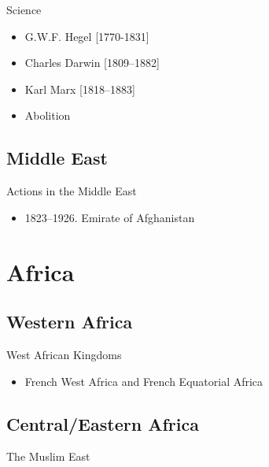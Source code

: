 
% 

\begin{frame}{Science}
	\begin{itemize}
		\item<1->G.W.F. Hegel [1770-1831]
		\item<2->Charles Darwin [1809--1882]
		\item<3->Karl Marx [1818--1883]
		\item<4->Abolition
	\end{itemize}
\end{frame}

\subsection{Middle East}
\begin{frame}{Actions in the Middle East}
	\begin{itemize}
 		\item<2->1823--1926. Emirate of Afghanistan
	\end{itemize}
\end{frame}

\section{Africa}
\subsection{Western Africa}
\begin{frame}{West African Kingdoms}
	\begin{itemize}
		\item<14->French West Africa and French Equatorial Africa
	\end{itemize}
\end{frame}

\subsection{Central/Eastern Africa}
\begin{frame}{The Muslim East}
\end{frame}

